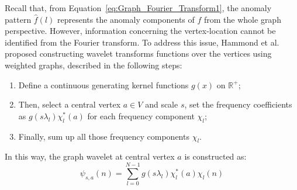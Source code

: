 \documentclass[twoside,leqno,twocolumn]{article}
\begin{document}

Recall that, from Equation~\ref{eq:Graph_Fourier_Transform1}, the anomaly pattern $\hat{f}(l)$ represents the anomaly components of $f$ from the whole graph perspective. However, information concerning the vertex-location cannot be identified from the Fourier transform. To address this issue, Hammond et al.~\cite{hammond2011wavelets} proposed constructing wavelet transforms functions over the vertices using weighted graphs, described in the following steps:

\begin{enumerate}
\item Define a continuous generating kernel functions $g(x)$ on $\mathbb{R}^+$;
\item Then, select a central vertex $a \in {V}$ and scale $s$, set the frequency coefficients as $g(s\lambda_l)\chi^*_l(a)$ for each frequency component $\chi_l$;
\item Finally, sum up all those frequency components $\chi_l$.
\end{enumerate}
In this way, the graph wavelet at central vertex $a$ is constructed as:
\begin{equation}
\label{eq:graphwaveletdefinition}
\psi_{s,a}(n) = \sum\limits_{l=0}^{N-1}g(s\lambda_l)\chi_l^*(a)\chi_l(n)
\end{equation}
\end{document}
